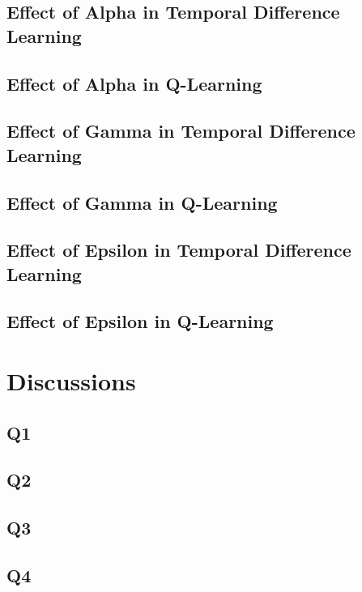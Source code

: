 \documentclass{assignment}
\begin{document}
\subsection{Effect of Alpha in Temporal Difference Learning}

\subsection{Effect of Alpha in Q-Learning}

\subsection{Effect of Gamma in Temporal Difference Learning}

\subsection{Effect of Gamma in Q-Learning}

\subsection{Effect of Epsilon in Temporal Difference Learning}

\subsection{Effect of Epsilon in Q-Learning}

\section{Discussions}
\subsection{Q1}

\subsection{Q2}

\subsection{Q3}

\subsection{Q4}
\end{document}
